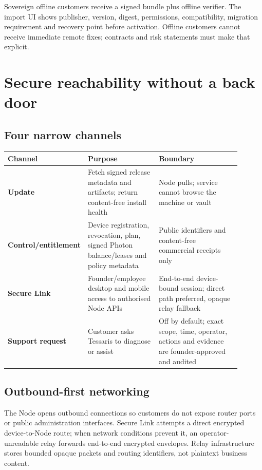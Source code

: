 \documentclass[11pt]{article}
\begin{document}
Sovereign offline customers receive a signed bundle plus offline verifier. The import UI shows publisher, version, digest, permissions, compatibility, migration requirement and recovery point before activation. Offline customers cannot receive immediate remote fixes; contracts and risk statements must make that explicit.

\section{Secure reachability without a back door}

\subsection{Four narrow channels}

\begin{longtable}{>{\raggedright\arraybackslash\bfseries}p{0.20\linewidth} p{0.31\linewidth} p{0.39\linewidth}}
\toprule
Channel & Purpose & Boundary \\
\midrule
\endhead
Update & Fetch signed release metadata and artifacts; return content-free install health & Node pulls; service cannot browse the machine or vault \\
Control/entitlement & Device registration, revocation, plan, signed Photon balance/leases and policy metadata & Public identifiers and content-free commercial receipts only \\
Secure Link & Founder/employee desktop and mobile access to authorised Node APIs & End-to-end device-bound session; direct path preferred, opaque relay fallback \\
Support request & Customer asks Tessaris to diagnose or assist & Off by default; exact scope, time, operator, actions and evidence are founder-approved and audited \\
\bottomrule
\end{longtable}

\subsection{Outbound-first networking}

The Node opens outbound connections so customers do not expose router ports or public administration interfaces. Secure Link attempts a direct encrypted device-to-Node route; when network conditions prevent it, an operator-unreadable relay forwards end-to-end encrypted envelopes. Relay infrastructure stores bounded opaque packets and routing identifiers, not plaintext business content.
\end{document}
